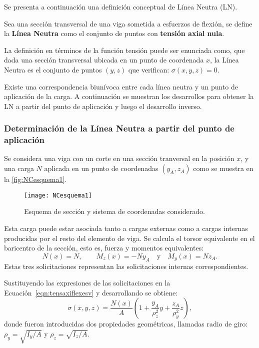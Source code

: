 Se presenta a continuación una definición conceptual de Línea Neutra (LN).

{Sea una sección transversal de una viga sometida a esfuerzos de flexión, se define la \textbf{Línea Neutra} como el conjunto de puntos con \textbf{tensión axial nula}.}

La definición en términos de la función tensión puede ser enunciada como, que dada una sección transversal ubicada en un punto de coordenada $x$, la Línea Neutra es el conjunto de puntos $(y,z)$ que verifican: $\sigma(x,y,z) = 0$.

Existe una correspondencia biunívoca entre cada línea neutra y un punto de aplicación de la carga. %
%
A continuación se muestran los desarrollos para obtener la LN a partir del punto de aplicación y luego el desarrollo inverso.

\subsubsection{Determinación de la Línea Neutra a partir del punto de aplicación}


Se considera una viga con un corte en una sección tranversal en la posición $x$, y una carga $N$ aplicada en un punto de coordenadas $(y_A,z_A)$ como se muestra en la \autoref{fig:NCesquema1}. %

\begin{figure}[htb]
	\centering
	\texttt{[image: NCesquema1]}
	\caption{Esquema de sección y sistema de coordenadas considerado.}
	\label{fig:NCesquema1}
\end{figure}

Esta carga puede estar asociada tanto a cargas externas como a cargas internas producidas por el resto del elemento de viga. %
%
Se calcula el torsor equivalente en el baricentro de la sección, esto es, fuerza y momentos equivalentes:
%
\begin{equation}
N(x) = N, \qquad  M_z(x) = -N y_A \quad  \text{y} \quad M_y(x) = N z_A.
\end{equation}
%
Estas tres solicitaciones representan las solicitaciones internas correspondientes.


Sustituyendo las expresiones de las solicitaciones en la Ecuación~\eqref{eqn:tensaxiflexesv} y desarrollando se obtiene:
%
\begin{equation}
\sigma(x,y,z) = \frac{N(x)}{A}
\left(1 +  \frac{ y_A}{\rho_z^2} y +  \frac{ z_A}{\rho_y^2} z \right),
\end{equation}
%
donde fueron introducidas dos propiedades geométricas, llamadas radio de giro: $\rho_y = \sqrt{ I_y / A}$ y $\rho_z = \sqrt{ I_z / A}$. %
%

